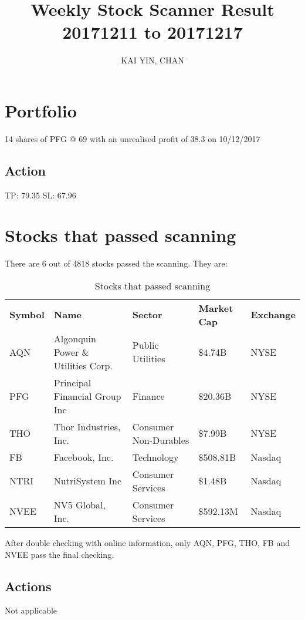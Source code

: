 \documentclass{article}
\begin{document}
\title{Weekly Stock Scanner Result \\ 20171211 to 20171217}
\author{KAI YIN, CHAN}
\maketitle

\section{Portfolio}
14 shares of PFG @ 69 with an unrealised profit of 38.3 on 10/12/2017

\subsection{Action}
TP: 79.35 SL: 67.96

\section{Stocks that passed scanning}

There are 6 out of 4818 stocks passed the scanning.  They are:
\begin{table}[htbp]
  \caption{Stocks that passed scanning}
    \begin{tabular}{lllll}
    \textbf{Symbol} & \textbf{Name} & \textbf{Sector} & \textbf{Market Cap} & \textbf{Exchange} \\
    AQN   & Algonquin Power \& Utilities Corp. & Public Utilities & \$4.74B & NYSE \\
    PFG   & Principal Financial Group Inc & Finance & \$20.36B & NYSE \\
    THO   & Thor Industries, Inc. & Consumer Non-Durables & \$7.99B & NYSE \\
    FB    & Facebook, Inc. & Technology & \$508.81B & Nasdaq \\
    NTRI  & NutriSystem Inc & Consumer Services & \$1.48B & Nasdaq \\
    NVEE  & NV5 Global, Inc. & Consumer Services & \$592.13M & Nasdaq \\
    \end{tabular}%
  \label{tab:addlabel}%
\end{table}%

After double checking with online information, only AQN, PFG, THO, FB and NVEE pass the final checking.

\subsection{Actions}
Not applicable
\end{document}
